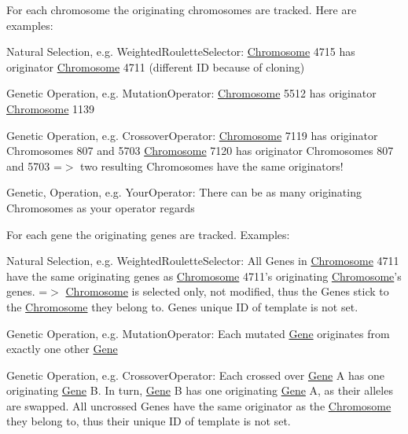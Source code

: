 For each chromosome the originating chromosomes are tracked. Here are examples\-:

Natural Selection, e.\-g. Weighted\-Roulette\-Selector\-: \hyperlink{classorg_1_1jgap_1_1_chromosome}{Chromosome} 4715 has originator \hyperlink{classorg_1_1jgap_1_1_chromosome}{Chromosome} 4711 (different I\-D because of cloning)

Genetic Operation, e.\-g. Mutation\-Operator\-: \hyperlink{classorg_1_1jgap_1_1_chromosome}{Chromosome} 5512 has originator \hyperlink{classorg_1_1jgap_1_1_chromosome}{Chromosome} 1139

Genetic Operation, e.\-g. Crossover\-Operator\-: \hyperlink{classorg_1_1jgap_1_1_chromosome}{Chromosome} 7119 has originator Chromosomes 807 and 5703 \hyperlink{classorg_1_1jgap_1_1_chromosome}{Chromosome} 7120 has originator Chromosomes 807 and 5703 =$>$ two resulting Chromosomes have the same originators!

Genetic, Operation, e.\-g. Your\-Operator\-: There can be as many originating Chromosomes as your operator regards 



For each gene the originating genes are tracked. Examples\-:

Natural Selection, e.\-g. Weighted\-Roulette\-Selector\-: All Genes in \hyperlink{classorg_1_1jgap_1_1_chromosome}{Chromosome} 4711 have the same originating genes as \hyperlink{classorg_1_1jgap_1_1_chromosome}{Chromosome} 4711's originating \hyperlink{classorg_1_1jgap_1_1_chromosome}{Chromosome}'s genes. =$>$ \hyperlink{classorg_1_1jgap_1_1_chromosome}{Chromosome} is selected only, not modified, thus the Genes stick to the \hyperlink{classorg_1_1jgap_1_1_chromosome}{Chromosome} they belong to. Genes unique I\-D of template is not set.

Genetic Operation, e.\-g. Mutation\-Operator\-: Each mutated \hyperlink{interfaceorg_1_1jgap_1_1_gene}{Gene} originates from exactly one other \hyperlink{interfaceorg_1_1jgap_1_1_gene}{Gene}

Genetic Operation, e.\-g. Crossover\-Operator\-: Each crossed over \hyperlink{interfaceorg_1_1jgap_1_1_gene}{Gene} A has one originating \hyperlink{interfaceorg_1_1jgap_1_1_gene}{Gene} B. In turn, \hyperlink{interfaceorg_1_1jgap_1_1_gene}{Gene} B has one originating \hyperlink{interfaceorg_1_1jgap_1_1_gene}{Gene} A, as their alleles are swapped. All uncrossed Genes have the same originator as the \hyperlink{classorg_1_1jgap_1_1_chromosome}{Chromosome} they belong to, thus their unique I\-D of template is not set.

